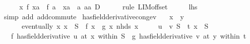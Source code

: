 \begin{isabellebody}
\ \ \isamarkupfalse%
\ \isamarkupfalse%
\ {\isachardoublequoteopen}{\isacharparenleft}{\kern0pt}{\isasymlambda}x{\isachardot}{\kern0pt}\ {\isacharparenleft}{\kern0pt}f\ {\isacharparenleft}{\kern0pt}x{\isacharplus}{\kern0pt}a{\isacharparenright}{\kern0pt}\ {\isacharminus}{\kern0pt}\ f\ a{\isacharparenright}{\kern0pt}\ {\isacharslash}{\kern0pt}\ {\isacharparenleft}{\kern0pt}{\isacharparenleft}{\kern0pt}x{\isacharplus}{\kern0pt}a{\isacharparenright}{\kern0pt}\ {\isacharminus}{\kern0pt}\ a{\isacharparenright}{\kern0pt}{\isacharparenright}{\kern0pt}\ {\isasymmidarrow}a{\isacharminus}{\kern0pt}a{\isasymrightarrow}\ D{\isachardoublequoteclose}\isanewline
\ \ \ \ \isamarkupfalse%
\ {\isacharparenleft}{\kern0pt}rule\ LIM{\isacharunderscore}{\kern0pt}offset{\isacharparenright}{\kern0pt}\isanewline
\ \ \isamarkupfalse%
\ \isamarkupfalse%
\ {\isacharquery}{\kern0pt}lhs\isanewline
\ \ \ \ \isamarkupfalse%
\ {\isacharparenleft}{\kern0pt}simp\ add{\isacharcolon}{\kern0pt}\ add{\isachardot}{\kern0pt}commute{\isacharparenright}{\kern0pt}\isanewline
{}\isamarkupfalse%
%
\endisatagproof
{\isafoldproof}%
%
\isadelimproof
\isanewline
%
\endisadelimproof
\isanewline
{}\isamarkupfalse%
\ has{\isacharunderscore}{\kern0pt}field{\isacharunderscore}{\kern0pt}derivative{\isacharunderscore}{\kern0pt}cong{\isacharunderscore}{\kern0pt}ev{\isacharcolon}{\kern0pt}\isanewline
\ \ \ {\isachardoublequoteopen}x\ {\isacharequal}{\kern0pt}\ y{\isachardoublequoteclose}\isanewline
\ \ \ \ \ {\isacharasterisk}{\kern0pt}{\isacharcolon}{\kern0pt}\ {\isachardoublequoteopen}eventually\ {\isacharparenleft}{\kern0pt}{\isasymlambda}x{\isachardot}{\kern0pt}\ x\ {\isasymin}\ S\ {\isasymlongrightarrow}\ f\ x\ {\isacharequal}{\kern0pt}\ g\ x{\isacharparenright}{\kern0pt}\ {\isacharparenleft}{\kern0pt}nhds\ x{\isacharparenright}{\kern0pt}{\isachardoublequoteclose}\isanewline
\ \ \ \ \ {\isachardoublequoteopen}u\ {\isacharequal}{\kern0pt}\ v{\isachardoublequoteclose}\ {\isachardoublequoteopen}S\ {\isacharequal}{\kern0pt}\ t{\isachardoublequoteclose}\ {\isachardoublequoteopen}x\ {\isasymin}\ S{\isachardoublequoteclose}\isanewline
\ \ \ {\isachardoublequoteopen}{\isacharparenleft}{\kern0pt}f\ has{\isacharunderscore}{\kern0pt}field{\isacharunderscore}{\kern0pt}derivative\ u{\isacharparenright}{\kern0pt}\ {\isacharparenleft}{\kern0pt}at\ x\ within\ S{\isacharparenright}{\kern0pt}\ {\isacharequal}{\kern0pt}\ {\isacharparenleft}{\kern0pt}g\ has{\isacharunderscore}{\kern0pt}field{\isacharunderscore}{\kern0pt}derivative\ v{\isacharparenright}{\kern0pt}\ {\isacharparenleft}{\kern0pt}at\ y\ within\ t{\isacharparenright}{\kern0pt}{\isachardoublequoteclose}\isanewline

\end{isabellebody}
